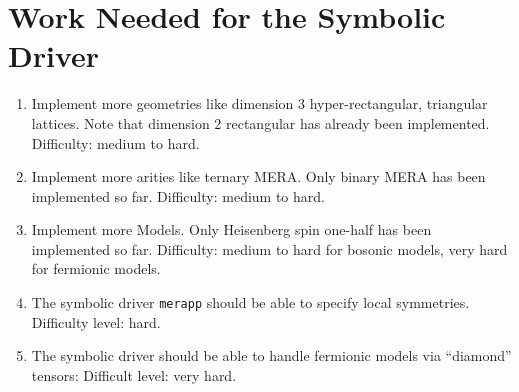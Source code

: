 \documentclass{article}
\newcommand{\code}[1]{\texttt{#1}}
\begin{document}
\section{Work Needed for the Symbolic Driver}
\begin{enumerate}
	\item Implement more geometries like dimension 3 hyper-rectangular, triangular lattices. Note that dimension 2 rectangular has already been implemented.
	Difficulty: medium to hard.
	\item Implement more arities like ternary MERA. Only binary MERA has been implemented so far. 	Difficulty: medium to hard.
	\item Implement more Models. Only Heisenberg spin one-half has been implemented so far. 	Difficulty: medium to hard for bosonic models, very hard for
	fermionic models.
	\item The symbolic driver \code{merapp} should be able to specify local symmetries. Difficulty level: hard.
	\item The symbolic driver should be able to handle fermionic models via ``diamond'' tensors: Difficult level: very hard.
\end{enumerate}
\end{document}
